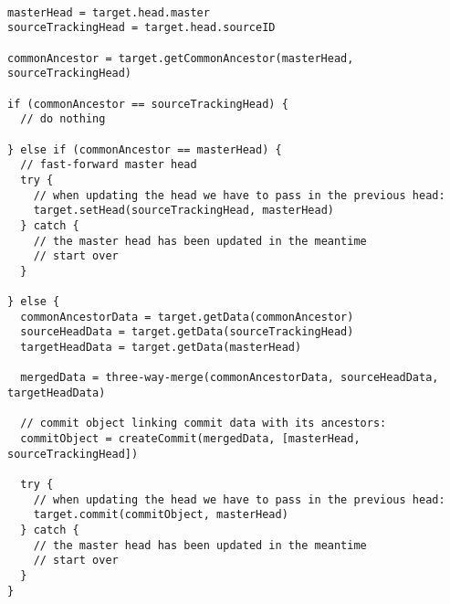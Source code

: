 \begin{lstlisting}[caption=Merging Protocol, label=merging-protocol]

masterHead = target.head.master
sourceTrackingHead = target.head.sourceID

commonAncestor = target.getCommonAncestor(masterHead, sourceTrackingHead)

if (commonAncestor == sourceTrackingHead) {
  // do nothing

} else if (commonAncestor == masterHead) {
  // fast-forward master head
  try {
    // when updating the head we have to pass in the previous head:
    target.setHead(sourceTrackingHead, masterHead)
  } catch {
    // the master head has been updated in the meantime
    // start over
  }

} else {
  commonAncestorData = target.getData(commonAncestor)
  sourceHeadData = target.getData(sourceTrackingHead)
  targetHeadData = target.getData(masterHead)

  mergedData = three-way-merge(commonAncestorData, sourceHeadData, targetHeadData)

  // commit object linking commit data with its ancestors:
  commitObject = createCommit(mergedData, [masterHead, sourceTrackingHead])

  try {
    // when updating the head we have to pass in the previous head:
    target.commit(commitObject, masterHead)    
  } catch {
    // the master head has been updated in the meantime
    // start over
  }
}

\end{lstlisting}
